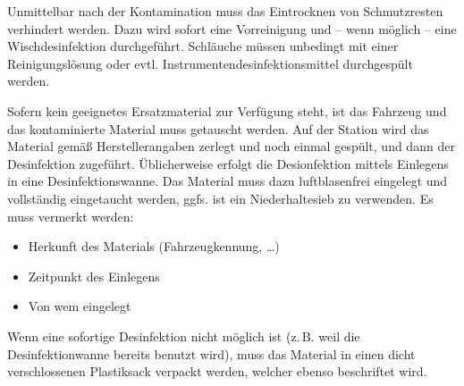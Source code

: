 {Unmittelbar nach der Kontamination muss das Eintrocknen von
Schmutzresten verhindert werden. Dazu wird sofort eine
Vorreinigung und -- wenn möglich -- eine Wischdesinfektion
durchgeführt. Schläuche müssen unbedingt mit einer
Reinigungslösung oder evtl. Instrumentendesinfektionsmittel
durchgespült werden.

Sofern kein geeignetes Ersatzmaterial zur Verfügung steht,
ist das Fahrzeug  und das
kontaminierte Material muss getauscht werden. Auf der
Station wird das Material gemäß Herstellerangaben zerlegt
und noch einmal gespült, und dann der Desinfektion
zugeführt. Üblicherweise erfolgt die Desionfektion mittels
Einlegens in eine Desinfektionswanne. Das Material muss dazu
luftblasenfrei eingelegt und vollständig eingetaucht werden,
ggfs. ist ein Niederhaltesieb zu verwenden. Es muss vermerkt
werden:

\begin{itemize}
  \item Herkunft des Materials (Fahrzeugkennung, \ldots)
  \item Zeitpunkt des Einlegens
  \item Von wem eingelegt
\end{itemize}

Wenn eine sofortige Desinfektion nicht möglich ist (z.\,B.
weil die Desinfektionwanne bereits benutzt wird), muss das
Material in einen dicht verschlossenen Plastiksack verpackt
werden, welcher ebenso beschriftet wird.

\bigskip

\bigskip

\bigskip

\bigskip

\bigskip

\bigskip

\bigskip


}

